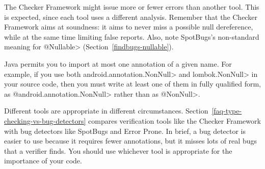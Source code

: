 

The Checker Framework might issue more or fewer errors than another tool.
This is expected, since each tool uses a different analysis.  Remember that
the Checker Framework aims at soundness:  it aims to never miss a possible
null dereference, while at the same time limiting false reports.  Also,
note SpotBugs's non-standard meaning for \<@Nullable>
(Section~\ref{findbugs-nullable}).

Java permits you to import at most one annotation of a given name.  For
example, if you use both \<android.annotation.NonNull> and
\<lombok.NonNull> in your source code, then you must write at least one of
them in fully qualified form, as \<@android.annotation.NonNull> rather than
as \<@NonNull>.



Different tools are appropriate in different circumstances.
Section~\ref{faq-type-checking-vs-bug-detectors} compares verification
tools like the Checker Framework with bug detectors like SpotBugs and Error
Prone.  In brief, a bug detector is easier to use because it requires fewer
annotations, but it misses lots of real bugs that a verifier finds.  You
should use whichever tool is appropriate for the importance of your code.

